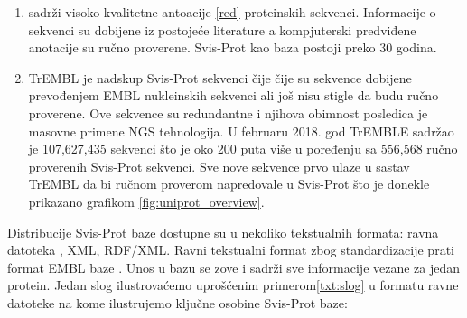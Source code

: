 \begin{enumerate}
  \item {}  sadrži visoko kvalitetne antoacije
    \ref{red} proteinskih sekvenci.
    Informacije o sekvenci su dobijene iz postojeće literature a kompjuterski
    predviđene anotacije su ručno proverene. Svis-Prot kao baza postoji preko
    30 godina.

  \item TrEMBL  je nadskup Svis-Prot sekvenci čije čije su
    sekvence dobijene prevođenjem EMBL nukleinskih sekvenci ali još nisu stigle
    da budu ručno  proverene. Ove sekvence su redundantne i njihova obimnost
    posledica je masovne primene NGS tehnologija. U februaru 2018. god TrEMBLE
    sadržao je 107,627,435 sekvenci što je oko 200 puta više u poređenju sa
    556,568 ručno proverenih Svis-Prot sekvenci. Sve nove sekvence prvo ulaze u
    sastav TrEMBL da bi ručnom proverom napredovale u Svis-Prot što je donekle
    prikazano grafikom \ref{fig:uniprot_overview}.
\end{enumerate}





Distribucije Svis-Prot baze dostupne su u nekoliko tekstualnih formata: ravna
datoteka , XML, RDF/XML.  Ravni tekstualni format zbog
standardizacije prati format EMBL\parencite{embl} baze
\parencite{svisprot2003}.  Unos u bazu se zove   i
sadrži sve informacije vezane za jedan protein. Jedan slog ilustrovaćemo
uprošćenim primerom\ref{txt:slog} u formatu ravne datoteke na kome ilustrujemo
ključne osobine Svis-Prot baze:


